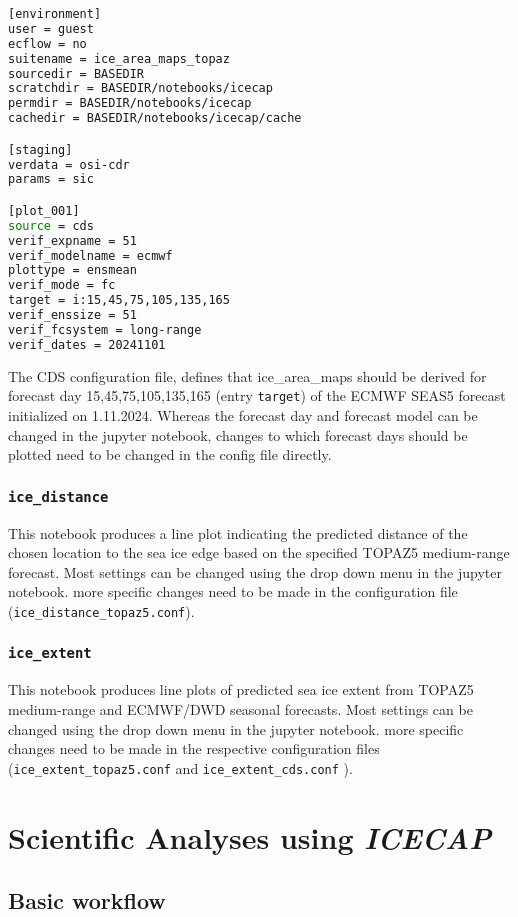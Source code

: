 \documentclass[DIV=10, parskip=full]{scrreprt}
\newcommand{\ice}{\textit{ICECAP}\xspace}
\begin{document}
\begin{lstlisting}[language=bash]
[environment]
user = guest
ecflow = no
suitename = ice_area_maps_topaz
sourcedir = BASEDIR
scratchdir = BASEDIR/notebooks/icecap
permdir = BASEDIR/notebooks/icecap
cachedir = BASEDIR/notebooks/icecap/cache

[staging]
verdata = osi-cdr
params = sic

[plot_001]
source = cds
verif_expname = 51
verif_modelname = ecmwf
plottype = ensmean
verif_mode = fc
target = i:15,45,75,105,135,165
verif_enssize = 51
verif_fcsystem = long-range
verif_dates = 20241101
\end{lstlisting}

The CDS configuration file, defines that ice\_area\_maps should be derived for forecast day 15,45,75,105,135,165 (entry \texttt{target}) of the ECMWF SEAS5 forecast initialized on 1.11.2024. Whereas the forecast day and forecast model can be changed in the jupyter notebook, changes to which forecast days should be plotted need to be changed in the config file directly.

\subsection{\texttt{ice\_distance}}
This notebook produces a line plot indicating the predicted distance of the chosen location to the sea ice edge based on the specified TOPAZ5 medium-range forecast. Most settings can be changed using the drop down menu in the jupyter notebook. more specific changes need to be made in the configuration file (\texttt{ice\_distance\_topaz5.conf}).

\subsection{\texttt{ice\_extent}}
This notebook produces line plots of predicted sea ice extent from TOPAZ5 medium-range and ECMWF/DWD seasonal forecasts. Most settings can be changed using the drop down menu in the jupyter notebook. more specific changes need to be made in the respective configuration files (\texttt{ice\_extent\_topaz5.conf} and \texttt{ice\_extent\_cds.conf} ).


\chapter{Scientific Analyses using \ice}
\section{Basic workflow}
\end{document}

